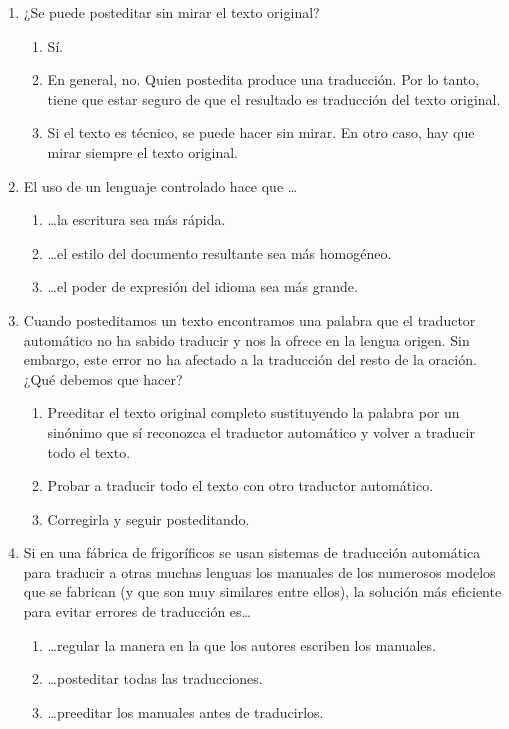 \begin{enumerate}
\item ¿Se puede posteditar sin mirar el texto original? \begin{enumerate} \item Sí. \item En general, no. Quien postedita produce una traducción. Por lo tanto, tiene que estar seguro de que el resultado es traducción del texto original. \item Si el texto es técnico, se puede hacer sin mirar. En otro caso, hay que mirar siempre el texto original. \end{enumerate} 

\item El uso de un lenguaje controlado hace que \ldots\begin{enumerate} \item \ldots la escritura sea más rápida. \item \ldots el estilo del documento resultante sea más homogéneo. \item \ldots el poder de expresión del idioma sea más grande. \end{enumerate} 

\item Cuando posteditamos un texto encontramos una palabra que el traductor automático no ha sabido traducir y nos la ofrece en la lengua origen. Sin embargo, este error no ha afectado a la traducción del resto de la oración. ¿Qué debemos que hacer? \begin{enumerate} \item Preeditar el texto original completo sustituyendo la palabra por un sinónimo que sí reconozca el traductor automático y volver a traducir todo el texto. \item Probar a traducir todo el texto con otro traductor automático. \item Corregirla y seguir posteditando. \end{enumerate} 

\item Si en una fábrica de frigoríficos se usan sistemas de traducción automática para traducir a otras muchas lenguas los manuales de los numerosos modelos que se fabrican (y que son muy similares entre ellos), la solución más eficiente para evitar errores de traducción es{\ldots} \begin{enumerate} \item \ldots regular la manera en la que los autores escriben los manuales. \item \ldots posteditar todas las traducciones. \item \ldots preeditar los manuales antes de traducirlos. \end{enumerate} 


\end{enumerate}
